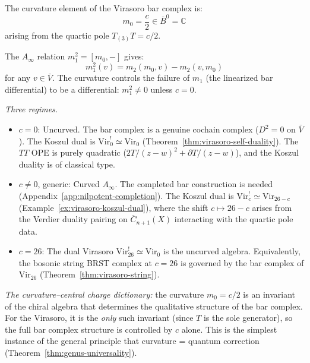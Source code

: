 \begin{computation}[Curvature element and \texorpdfstring{$c=0$}{c=0} special value]\label{comp:virasoro-curvature}
The curvature element of the Virasoro bar complex is:
\begin{equation}\label{eq:vir-curvature}
m_0 = \frac{c}{2} \in \bar{B}^0 = \mathbb{C}
\end{equation}
arising from the quartic pole $T_{(3)}T = c/2$.

The $A_\infty$ relation $m_1^2 = [m_0, -]$ gives:
\begin{equation}
m_1^2(v) = m_2(m_0, v) - m_2(v, m_0)
\end{equation}
for any $v \in \bar{V}$.  The curvature controls the failure of $m_1$ (the linearized bar differential) to be a differential: $m_1^2 \neq 0$ unless $c = 0$.

\emph{Three regimes.}
\begin{itemize}
\item $c = 0$: Uncurved.  The bar complex is a genuine cochain complex ($D^2 = 0$ on $\bar{V}$).  The Koszul dual is $\mathrm{Vir}_0^! \simeq \mathrm{Vir}_0$ (Theorem~\ref{thm:virasoro-self-duality}).  The $TT$ OPE is purely quadratic ($2T/(z-w)^2 + \partial T/(z-w)$), and the Koszul duality is of classical type.
\item $c \neq 0$, generic: Curved $A_\infty$.  The completed bar construction is needed (Appendix~\ref{app:nilpotent-completion}).  The Koszul dual is $\mathrm{Vir}_c^! \simeq \mathrm{Vir}_{26-c}$ (Example~\ref{ex:virasoro-koszul-dual}), where the shift $c \mapsto 26-c$ arises from the Verdier duality pairing on $\overline{C}_{n+1}(X)$ interacting with the quartic pole data.
\item $c = 26$: The dual Virasoro $\mathrm{Vir}_{26}^! \simeq \mathrm{Vir}_0$ is the uncurved algebra.  Equivalently, the bosonic string BRST complex at $c=26$ is governed by the bar complex of $\mathrm{Vir}_{26}$ (Theorem~\ref{thm:virasoro-string}).
\end{itemize}

\emph{The curvature--central charge dictionary:} the curvature $m_0 = c/2$ is an invariant of the chiral algebra that determines the qualitative structure of the bar complex.  For the Virasoro, it is the \emph{only} such invariant (since $T$ is the sole generator), so the full bar complex structure is controlled by $c$ alone.  This is the simplest instance of the general principle that curvature = quantum correction (Theorem~\ref{thm:genus-universality}).
\end{computation}

